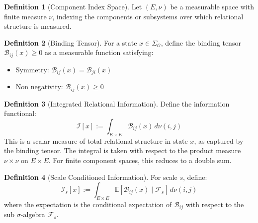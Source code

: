 \documentclass[12pt]{article}
\theoremstyle{definition}
\newtheorem{definition}{Definition}
\begin{document}
\begin{definition}[Component Index Space]
Let $(E, \nu)$ be a measurable space with finite measure $\nu$, indexing the components or subsystems over which relational structure is measured.
\end{definition}

\begin{definition}[Binding Tensor]
For a state $x \in \Sigma_{\mathcal{O}}$, define the binding tensor $\mathcal{B}_{ij}(x) \geq 0$ as a measurable function satisfying:
\begin{itemize}
    \item Symmetry: $\mathcal{B}_{ij}(x) = \mathcal{B}_{ji}(x)$
    \item Non negativity: $\mathcal{B}_{ij}(x) \geq 0$
\end{itemize}
\end{definition}

\begin{definition}[Integrated Relational Information]
Define the information functional:
\begin{equation}
\mathcal{I}[x] := \int_{E \times E} \mathcal{B}_{ij}(x) \, d\nu(i,j)
\end{equation}
This is a scalar measure of total relational structure in state $x$, as captured by the binding tensor. The integral is taken with respect to the product measure $\nu \times \nu$ on $E \times E$. For finite component spaces, this reduces to a double sum.
\end{definition}

\begin{definition}[Scale Conditioned Information]
For scale $s$, define:
\begin{equation}
\mathcal{I}_s[x] := \int_{E \times E} \mathbb{E}[\mathcal{B}_{ij}(x) \mid \mathcal{F}_s] \, d\nu(i,j)
\end{equation}
where the expectation is the conditional expectation of $\mathcal{B}_{ij}$ with respect to the sub $\sigma$-algebra $\mathcal{F}_s$.
\end{definition}
\end{document}
